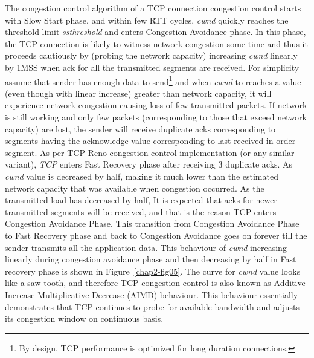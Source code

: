 \begin{multicols}{2}
The congestion control algorithm of a  TCP connection congestion control starts with Slow Start phase, and within few RTT cycles, \textit{cwnd} quickly  reaches the threshold limit \textit{ssthreshold} and enters Congestion Avoidance phase. In this phase, the TCP connection is likely to witness network congestion some time and thus it proceeds cautiously by (probing the network capacity) increasing \textit{cwnd} linearly by 1MSS when ack for all the transmitted segments are received. For simplicity assume that sender has enough data to send\footnote{By design, TCP performance is optimized for long duration connections.} and when \textit{cwnd} to reaches a value (even though with linear increase) greater than network capacity, it will experience network congestion causing loss of few transmitted packets. If network is still working and only few packets (corresponding to those that exceed network capacity) are lost, the sender will receive duplicate acks corresponding to segments having the acknowledge value corresponding to last received in order segment. As per TCP Reno congestion control implementation (or any similar variant), \textit{TCP} enters Fast Recovery phase after receiving 3 duplicate acks.  As \textit{cwnd} value is decreased by half, making it much lower than the estimated network capacity that was available when congestion occurred. As the transmitted load has decreased by half, It is expected that acks for newer transmitted segments will be received, and that is the reason TCP enters Congestion Avoidance Phase.  This transition from Congestion Avoidance Phase to Fast Recovery phase and back to Congestion Avoidance goes on forever till the sender transmits all the application data. This behaviour of \textit{cwnd} increasing linearly during congestion avoidance phase and then decreasing by half in  Fast recovery phase is shown in Figure~\ref{chap2-fig05}. The curve for \textit{cwnd} value looks like a saw tooth, and therefore TCP congestion control is also known as Additive Increase Multiplicative Decrease (AIMD) behaviour. This behaviour essentially demonstrates that TCP continues to probe for available bandwidth and adjusts its congestion window on continuous basis.


\end{multicols}
